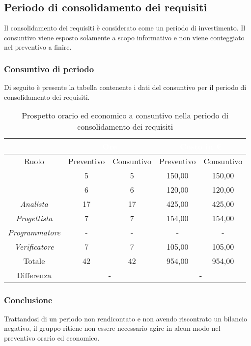 \subsection{Periodo di consolidamento dei requisiti}
Il consolidamento dei requisiti è considerato come un periodo di investimento. Il consuntivo viene esposto solamente a scopo informativo e non viene conteggiato nel preventivo a finire.
\subsubsection{Consuntivo di periodo}
Di seguito è presente la tabella contenente i dati del consuntivo per il periodo di consolidamento dei requisiti.
\begin{table}[H]
	\centering
	\begin{tabular}{|c|c|c|c|c|}
		\rowcolor{darkblue} 
		&\multicolumn{2}{c|}{\textcolor{white}{Ore}}&\multicolumn{2}{c|}{\textcolor{white}{Costo in €}}\\ \hline
		Ruolo			&	Preventivo				&	Consuntivo		&	Preventivo	&	Consuntivo\\ \hline
		{\Responsabile}		&	5					&	5				&	150,00		&	150,00 \\ \hline
		{\Amministratore}	&	6					&	6				&	120,00		&	120,00 \\ \hline
		\textit{Analista}	&	17					&	17				&	425,00		&	425,00 \\ \hline
		\textit{Progettista}& 	7					&	7 				& 	154,00		&  	154,00 \\ \hline
		\textit{Programmatore}& -					& 	-				& 	-			&  	- \\ \hline
		\textit{Verificatore}&	7					&	7				&	105,00		&	105,00 \\ \hline
		Totale				&	42					&	42				&	954,00		&	954,00 \\ \hline
		Differenza			& 	\multicolumn{2}{c|}{-} 			&\multicolumn{2}{c|}{-}\\ \hline
	\end{tabular}
	\caption{Prospetto orario ed economico a consuntivo nella periodo di consolidamento dei requisiti}
\end{table}
\subsubsection{Conclusione}
Trattandosi di un periodo non rendicontato e non avendo riscontrato un bilancio negativo, il gruppo {\Gruppo} ritiene non essere necessario agire in alcun modo nel preventivo orario ed economico.